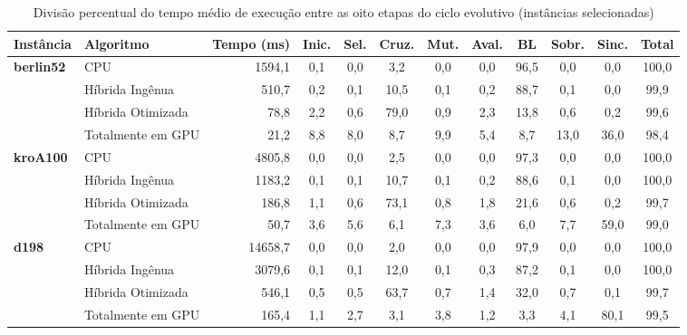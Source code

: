 \begin{table}[htbp]
  \centering
  \caption{Divisão percentual do tempo médio de execução entre as oito etapas do ciclo evolutivo (instâncias selecionadas)}\label{tbl:phase-timings}
  \begin{tabeladensa}
    \begin{tabular}{@{}llrccccccccc@{}}
      \toprule
      Instância         & Algoritmo         & Tempo (ms) & Inic. & Sel. & Cruz. & Mut. & Aval. & BL   & Sobr. & Sinc. & Total \\
      \midrule
      \textbf{berlin52} & CPU               & 1594,1     & 0,1   & 0,0  & 3,2   & 0,0  & 0,0   & 96,5 & 0,0   & 0,0   & 100,0 \\
                        & Híbrida Ingênua   & 510,7      & 0,2   & 0,1  & 10,5  & 0,1  & 0,2   & 88,7 & 0,1   & 0,0   & 99,9  \\
                        & Híbrida Otimizada & 78,8       & 2,2   & 0,6  & 79,0  & 0,9  & 2,3   & 13,8 & 0,6   & 0,2   & 99,6  \\
                        & Totalmente em GPU & 21,2       & 8,8   & 8,0  & 8,7   & 9,9  & 5,4   & 8,7  & 13,0  & 36,0  & 98,4  \\
      \midrule
      \textbf{kroA100}  & CPU               & 4805,8     & 0,0   & 0,0  & 2,5   & 0,0  & 0,0   & 97,3 & 0,0   & 0,0   & 100,0 \\
                        & Híbrida Ingênua   & 1183,2     & 0,1   & 0,1  & 10,7  & 0,1  & 0,2   & 88,6 & 0,1   & 0,0   & 100,0 \\
                        & Híbrida Otimizada & 186,8      & 1,1   & 0,6  & 73,1  & 0,8  & 1,8   & 21,6 & 0,6   & 0,2   & 99,7  \\
                        & Totalmente em GPU & 50,7       & 3,6   & 5,6  & 6,1   & 7,3  & 3,6   & 6,0  & 7,7   & 59,0  & 99,0  \\
      \midrule
      \textbf{d198}     & CPU               & 14658,7    & 0,0   & 0,0  & 2,0   & 0,0  & 0,0   & 97,9 & 0,0   & 0,0   & 100,0 \\
                        & Híbrida Ingênua   & 3079,6     & 0,1   & 0,1  & 12,0  & 0,1  & 0,3   & 87,2 & 0,1   & 0,0   & 100,0 \\
                        & Híbrida Otimizada & 546,1      & 0,5   & 0,5  & 63,7  & 0,7  & 1,4   & 32,0 & 0,7   & 0,1   & 99,7  \\
                        & Totalmente em GPU & 165,4      & 1,1   & 2,7  & 3,1   & 3,8  & 1,2   & 3,3  & 4,1   & 80,1  & 99,5  \\

\end{tabular}
\end{tabeladensa}
\end{table}
